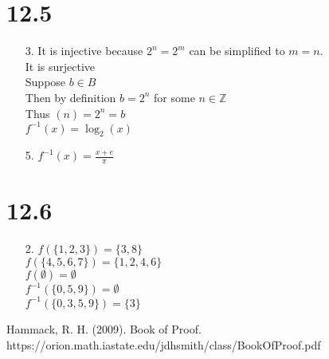\documentclass[sigconf]{article}
\begin{document}
\section*{12.5}
\begin{itemize}
  \item[3.] It is injective because $2^n=2^m$ can be simplified to $m=n$.\\
            It is surjective\\
            Suppose $b\in B$\\
            Then by definition $b=2^n$ for some $n\in\mathbb{Z}$\\
            Thus $(n)=2^n=b$\\
            $f^{-1}(x)=\log_2(x)$
  \item[5.] $f^{-1}(x)=\frac{x+e}{\pi}$
\end{itemize}

\section*{12.6}
\begin{itemize}
  \item[2.] $f(\{1,2,3\})=\{3,8\}$\\
            $f(\{4,5,6,7\})=\{1,2,4,6\}$\\
            $f(\emptyset)=\emptyset$\\
            $f^{-1}(\{0,5,9\})=\emptyset$\\
            $f^{-1}(\{0,3,5,9\})=\{3\}$
\end{itemize}


Hammack, R. H. (2009). Book of Proof.\\ https://orion.math.iastate.edu/jdhsmith/class/BookOfProof.pdf



\end{document}
